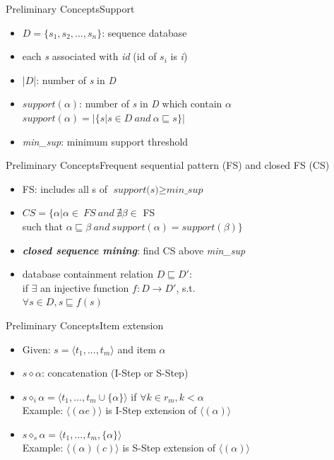 \documentclass[12pt]{beamer}
\begin{document}
\begin{frame}{Preliminary Concepts}{Support}
\begin{itemize}
\item $\textit{D} = \{ s_1,s_2,...,s_n \}$: sequence database
\item each \textit{s} associated with \textit{id} (id of $s_i$ is \textit{i})
\item |$\textit{D}$|: number of \textit{s} in \textit{D}
\item $support(\alpha)$: number of \textit{s} in \textit{D} which contain $\alpha$\\
$support(\alpha) = |\{ s|s \in D~and~\alpha \sqsubseteq s\}|$
\item \textit{min\_sup}: minimum support threshold
\end{itemize}
\end{frame}

\begin{frame}{Preliminary Concepts}{Frequent sequential pattern (FS) and closed FS (CS)}
\begin{itemize}
\item FS: includes all s of $\textit{support(s)} \ge \textit{min\_sup}$
\item $CS = \{ \alpha|\alpha \in~FS~and~\nexists\beta \in$ FS\\such that $\alpha \sqsubseteq \beta~and~support(\alpha) = support(\beta)\}$
\item {\bf {\it closed sequence mining}}: find CS above {\it min\_sup}
\item database containment relation $D \sqsubseteq D'$:\\if $\exists$ an injective function $f : D \rightarrow D'$, s.t.\\
$\forall s \in D, s \sqsubseteq f(s)$
\end{itemize}
\end{frame}

\begin{frame}{Preliminary Concepts}{Item extension}
\begin{itemize}
\item Given: $s = \langle t_1,...,t_m \rangle$ and item $\alpha$
\item $s \diamond \alpha$: concatenation (I-Step or S-Step)
\item $s \diamond_i \alpha = \langle t_1,...,t_m \cup \{ \alpha \} \rangle$ if $\forall k \in r_m, k < \alpha$\\ Example: $\langle (\alpha e) \rangle$ is I-Step extension of $\langle (\alpha) \rangle$
\item $s \diamond_s \alpha = \langle t_1,...,t_m,\{ \alpha \} \rangle$\\ Example: $\langle (\alpha)(c) \rangle$ is S-Step extension of $\langle (\alpha) \rangle$
\end{itemize}
\end{frame}
\end{document}
